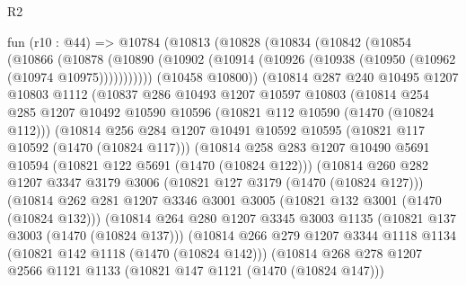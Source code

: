 \begin{lexlean}{R2}
\begin{coremodule}
  fun (r10 : @44) =>
  @10784
    (@10813
      (@10828
        (@10834
          (@10842
            (@10854
              (@10866
                (@10878
                  (@10890 (@10902 (@10914 (@10926 (@10938 (@10950 (@10962 (@10974 @10975)))))))))))
            (@10458 @10800))
          (@10814
            @287
            @240
            @10495
            @1207
            @10803
            @1112
            (@10837
              @286
              @10493
              @1207
              @10597
              @10803
              (@10814
                @254
                @285
                @1207
                @10492
                @10590
                @10596
                (@10821 @112 @10590 (@1470 (@10824 @112)))
                (@10814
                  @256
                  @284
                  @1207
                  @10491
                  @10592
                  @10595
                  (@10821 @117 @10592 (@1470 (@10824 @117)))
                  (@10814
                    @258
                    @283
                    @1207
                    @10490
                    @5691
                    @10594
                    (@10821 @122 @5691 (@1470 (@10824 @122)))
                    (@10814
                      @260
                      @282
                      @1207
                      @3347
                      @3179
                      @3006
                      (@10821 @127 @3179 (@1470 (@10824 @127)))
                      (@10814
                        @262
                        @281
                        @1207
                        @3346
                        @3001
                        @3005
                        (@10821 @132 @3001 (@1470 (@10824 @132)))
                        (@10814
                          @264
                          @280
                          @1207
                          @3345
                          @3003
                          @1135
                          (@10821 @137 @3003 (@1470 (@10824 @137)))
                          (@10814
                            @266
                            @279
                            @1207
                            @3344
                            @1118
                            @1134
                            (@10821 @142 @1118 (@1470 (@10824 @142)))
                            (@10814
                              @268
                              @278
                              @1207
                              @2566
                              @1121
                              @1133
                              (@10821 @147 @1121 (@1470 (@10824 @147)))

\end{coremodule}
\end{lexlean}

